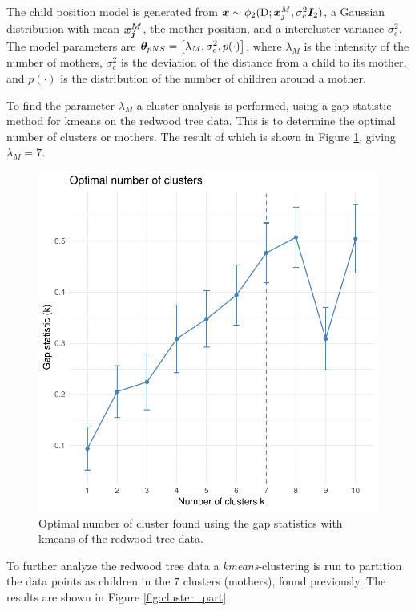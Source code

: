 The child position model is generated from $\bm{x} \sim \phi_2(\textrm{D};\bm{x}_j^M, \sigma_c^2\bm{I}_2)$, a Gaussian distribution with mean $\bm{x_j^M}$, the mother position, and a intercluster variance $\sigma_c^2$. The model parameters are $\bm{\theta}_{pNS} = \left[\lambda_M,\sigma_c^2,p(\cdot)\right]$, where $\lambda_M$ is the intensity of the number of mothers, $\sigma_c^2$ is the deviation of the distance from a child to its mother, and $p(\cdot)$ is the distribution of the number of children around a mother.

To find the parameter $\lambda_M$ a cluster analysis is performed, using a gap statistic method for kmeans on the redwood tree data. This is to determine the optimal number of clusters or mothers. The result of which is shown in Figure \ref{fig:numb_clust}, giving $\lambda_M = 7$.

\begin{figure}
    \centering
    \includegraphics[scale=0.95]{figures/numb_clusters.pdf}
    \caption{Optimal number of cluster found using the gap statistics with kmeans of the redwood tree data.}
    \label{fig:numb_clust}
\end{figure}

To further analyze the redwood tree data a \textit{kmeans}-clustering is run to partition the data points as children in the $7$ clusters (mothers), found previously. The results are shown in Figure \ref{fig:cluster_part}. 

